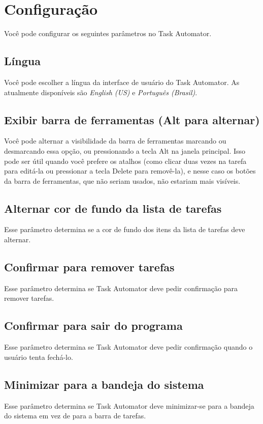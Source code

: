 \documentclass{article}
\begin{document}
\section{Configuração}
Você pode configurar os seguintes parâmetros no Task Automator.

\subsection{Língua}
Você pode escolher a língua da interface de usuário do Task Automator. As atualmente disponíveis são \emph{English (US)} e \emph{Português (Brasil)}.

\subsection{Exibir barra de ferramentas (Alt para alternar)}
Você pode alternar a visibilidade da barra de ferramentas marcando ou desmarcando essa opção, ou pressionando a tecla Alt na janela principal. Isso pode ser útil quando você prefere os atalhos (como clicar duas vezes na tarefa para editá-la ou pressionar a tecla Delete para removê-la), e nesse caso os botões da barra de ferramentas, que não seriam usados, não estariam mais visíveis.

\subsection{Alternar cor de fundo da lista de tarefas}
Esse parâmetro determina se a cor de fundo dos itens da lista de tarefas deve alternar.

\subsection{Confirmar para remover tarefas}
Esse parâmetro determina se Task Automator deve pedir confirmação para remover tarefas.

\subsection{Confirmar para sair do programa}
Esse parâmetro determina se Task Automator deve pedir confirmação quando o usuário tenta fechá-lo.

\subsection{Minimizar para a bandeja do sistema}
Esse parâmetro determina se Task Automator deve minimizar-se para a bandeja do sistema em vez de para a barra de tarefas.
\end{document}
